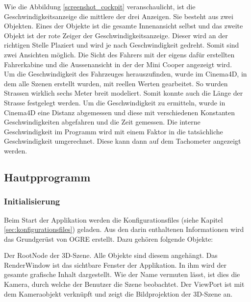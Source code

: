 Wie die Abbildung \ref{screenshot_cockpit} veranschaulicht, ist die Geschwindigkeitsanzeige die mittlere der drei Anzeigen. Sie besteht aus zwei Objekten. Eines der Objekte ist die gesamte Innenansicht selbst und das zweite Objekt ist der rote Zeiger der Geschwindigkeitsanzeige. Dieser wird an der richtigen Stelle Plaziert und wird je nach Geschwindigkeit gedreht. Somit sind zwei Ansichten möglich. Die Sicht des Fahrers mit der eigens dafür erstellten Fahrerkabine und die Aussenansicht in der der Mini Cooper angezeigt wird.\\
Um die Geschwindigkeit des Fahrzeuges herauszufinden, wurde im Cinema4D, in dem alle Szenen erstellt wurden, mit reellen Werten gearbeitet. So wurden Strassen wirklich sechs Meter breit modeliert. Somit konnte auch die Länge der Strasse festgelegt werden. Um die Geschwindigkeit zu ermitteln, wurde in Cinema4D eine Distanz abgemessen und diese mit verschiedenen Konstanten Geschwindigkeiten abgefahren und die Zeit gemessen. Die interne Geschwindigkeit im Programm wird mit einem Faktor in die tatsächliche Geschwindigkeit umgerechnet. Diese kann dann auf dem Tachometer angezeigt werden.\\



\newpage
\subsection{Hautpprogramm}


\subsubsection{Initialisierung}

Beim Start der Applikation werden die Konfigurationsfiles (siehe Kapitel \ref{sec:konfigurationsfiles}) geladen. Aus den darin enthaltenen Informationen wird das Grundgerüst von OGRE erstellt. Dazu gehören folgende Objekte:

Der RootNode der 3D-Szene. Alle Objekte sind diesem angehängt.
Das RenderWindow ist das sichtbare Fenster der Applikation. In ihm wird der gesamte grafische Inhalt dargestellt.
Wie der Name vermuten lässt, ist dies die Kamera, durch welche der Benutzer die Szene beobachtet.
Der ViewPort ist mit dem Kameraobjekt verknüpft und zeigt die Bildprojektion der 3D-Szene an. 


